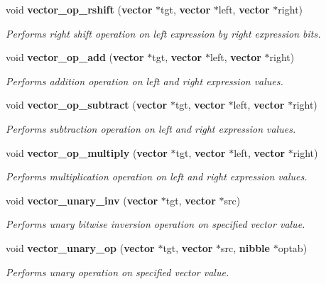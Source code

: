 \begin{CompactItemize}
void {\bf vector\_\-op\_\-rshift} ({\bf vector} $\ast$tgt, {\bf vector} $\ast$left, {\bf vector} $\ast$right)
\begin{CompactList}\small\item\em Performs right shift operation on left expression by right expression bits.\item\end{CompactList}\item 
void {\bf vector\_\-op\_\-add} ({\bf vector} $\ast$tgt, {\bf vector} $\ast$left, {\bf vector} $\ast$right)
\begin{CompactList}\small\item\em Performs addition operation on left and right expression values.\item\end{CompactList}\item 
void {\bf vector\_\-op\_\-subtract} ({\bf vector} $\ast$tgt, {\bf vector} $\ast$left, {\bf vector} $\ast$right)
\begin{CompactList}\small\item\em Performs subtraction operation on left and right expression values.\item\end{CompactList}\item 
void {\bf vector\_\-op\_\-multiply} ({\bf vector} $\ast$tgt, {\bf vector} $\ast$left, {\bf vector} $\ast$right)
\begin{CompactList}\small\item\em Performs multiplication operation on left and right expression values.\item\end{CompactList}\item 
void {\bf vector\_\-unary\_\-inv} ({\bf vector} $\ast$tgt, {\bf vector} $\ast$src)
\begin{CompactList}\small\item\em Performs unary bitwise inversion operation on specified vector value.\item\end{CompactList}\item 
void {\bf vector\_\-unary\_\-op} ({\bf vector} $\ast$tgt, {\bf vector} $\ast$src, {\bf nibble} $\ast$optab)
\begin{CompactList}\small\item\em Performs unary operation on specified vector value.\item\end{CompactList}\item 

\end{CompactItemize}
